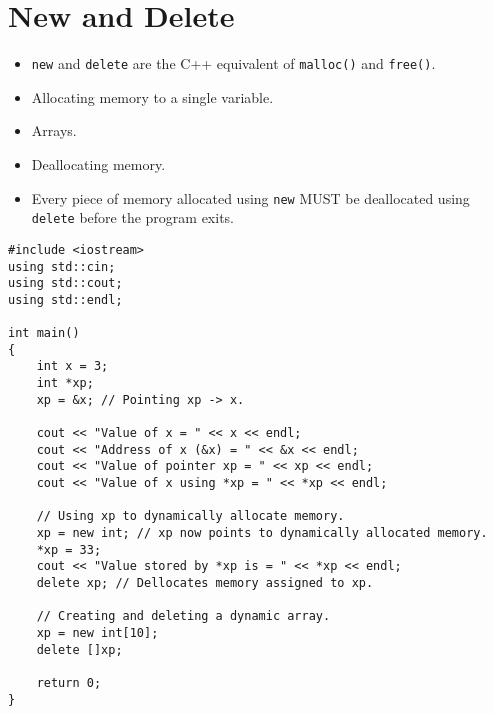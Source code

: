 \documentclass[12pt,a4paper]{article}
\begin{document}
\section{New and Delete}
\begin{itemize}
\item \verb|new| and \verb|delete| are the C++ equivalent of \verb|malloc()| and \verb|free()|.
\item Allocating memory to a single variable.
\item Arrays.
\item Deallocating memory.
\item Every piece of memory allocated using \verb|new| MUST be deallocated using \verb|delete| before the program exits.
\end{itemize}
\begin{lstlisting}[caption={new and delete}]
#include <iostream>
using std::cin;
using std::cout;
using std::endl;

int main()
{
	int x = 3;
	int *xp;
	xp = &x; // Pointing xp -> x.
	
	cout << "Value of x = " << x << endl;
	cout << "Address of x (&x) = " << &x << endl;
	cout << "Value of pointer xp = " << xp << endl;
	cout << "Value of x using *xp = " << *xp << endl;
	
	// Using xp to dynamically allocate memory.
	xp = new int; // xp now points to dynamically allocated memory.
	*xp = 33;
	cout << "Value stored by *xp is = " << *xp << endl;
	delete xp; // Dellocates memory assigned to xp.
	
	// Creating and deleting a dynamic array.
	xp = new int[10];
	delete []xp;
	
	return 0;
}
\end{lstlisting}
%
%
\end{document}

